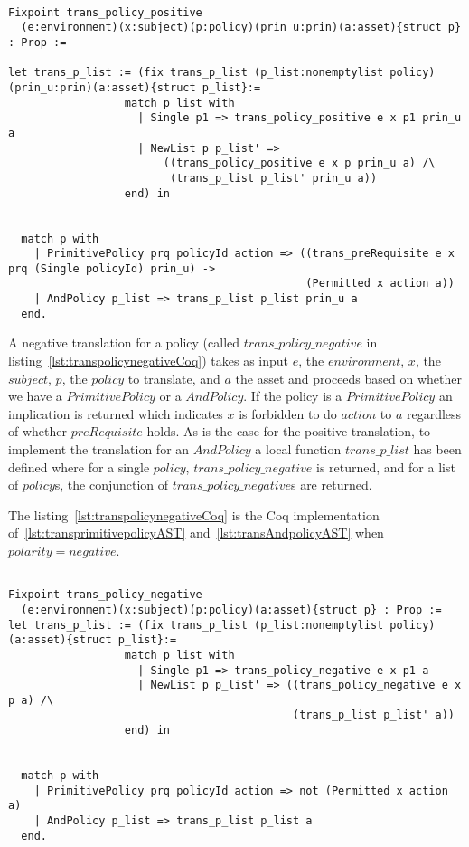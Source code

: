 \begin{lstlisting}

Fixpoint trans_policy_positive
  (e:environment)(x:subject)(p:policy)(prin_u:prin)(a:asset){struct p} : Prop :=

let trans_p_list := (fix trans_p_list (p_list:nonemptylist policy)(prin_u:prin)(a:asset){struct p_list}:=
                  match p_list with
                    | Single p1 => trans_policy_positive e x p1 prin_u a
                    | NewList p p_list' => 
                        ((trans_policy_positive e x p prin_u a) /\ 
                         (trans_p_list p_list' prin_u a))
                  end) in


  match p with
    | PrimitivePolicy prq policyId action => ((trans_preRequisite e x prq (Single policyId) prin_u) ->
                                              (Permitted x action a))
    | AndPolicy p_list => trans_p_list p_list prin_u a
  end.
\end{lstlisting}

A negative translation for a policy (called $trans\_policy\_negative$ in listing~\ref{lst:transpolicynegativeCoq}) takes as input $e$, the $environment$, $x$, the $subject$, $p$, the $policy$ to translate, and $a$ the asset and proceeds based on whether we have a $PrimitivePolicy$ or a $AndPolicy$. If the policy is a $PrimitivePolicy$ an implication is returned which indicates $x$ is forbidden to do $action$ to $a$ regardless of whether $preRequisite$ holds. As is the case for the positive translation, to implement the translation for an $AndPolicy$ a local function $trans\_p\_list$ has been defined where for a single $policy$, $trans\_policy\_negative$ is returned, and for a list of $policy$s, the conjunction of $trans\_policy\_negative$s are returned.

The listing~\ref{lst:transpolicynegativeCoq} is the Coq implementation of~\ref{lst:transprimitivepolicyAST} and~\ref{lst:transAndpolicyAST} when $polarity=negative$.


\begin{minipage}[c]{0.95\textwidth}
\begin{lstlisting}

Fixpoint trans_policy_negative
  (e:environment)(x:subject)(p:policy)(a:asset){struct p} : Prop :=
let trans_p_list := (fix trans_p_list (p_list:nonemptylist policy)(a:asset){struct p_list}:=
                  match p_list with
                    | Single p1 => trans_policy_negative e x p1 a
                    | NewList p p_list' => ((trans_policy_negative e x p a) /\ 
                                            (trans_p_list p_list' a))
                  end) in


  match p with
    | PrimitivePolicy prq policyId action => not (Permitted x action a)
    | AndPolicy p_list => trans_p_list p_list a
  end.
\end{lstlisting}
\end{minipage}

